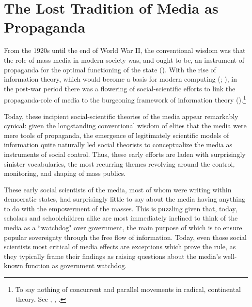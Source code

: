 \section{The Lost Tradition of Media as Propaganda}

From the 1920s until the end of World War II, the conventional wisdom was that the role of mass
media in modern society was, and ought to be, an instrument of propaganda for the optimal
functioning of the state (\citealt{Bernays:2004vo, lippmann1932public}). With the rise of
information theory, which would become a basis for modern computing (\citealt{Shannon:2013iy};
\citealt{gleick2011information}), in the post-war period there was a flowering of social-scientific
efforts to link the propaganda-role of media to the burgeoning framework of information theory
(\citealt{wiener1965cybernetics, Deutsch:1953ww, Deutsch:1966ux, McLuhan:1994tf,
Ellul:1965uf}).\footnote{To say nothing of concurrent and parallel movements in radical, continental
theory. See \citet{Horkheimer:2009te}, \citet{adorno2001culture}, \citet{Debord:1967vn}.}

Today, these incipient social-scientific theories of the media appear remarkably cynical: given the
longstanding conventional wisdom of elites that the media were mere tools of propaganda, the
emergence of legitimately scientific models of information quite naturally led social theorists to
conceptualize the media as instruments of social control. Thus, these early efforts are laden with
surprisingly sinister vocabularies, the most recurring themes revolving around the control,
monitoring, and shaping of mass publics.

These early social scientists of the media, most of whom were writing within democratic states, had
surprisingly little to say about the media having anything to do with the empowerment of the masses.
This is puzzling given that, today, scholars and schoolchildren alike are most immediately inclined
to think of the media as a ``watchdog" over government, the main purpose of which is to ensure
popular sovereignty through the free flow of information. Today, even those social scientists most
critical of media effects are exceptions which prove the rule, as they typically frame their
findings as raising questions about the media's well-known function as government watchdog.


